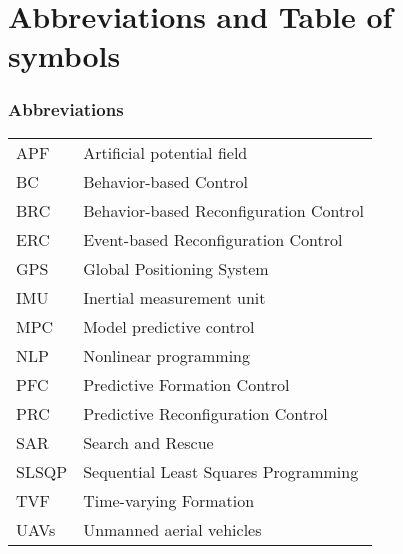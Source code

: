 \chapter*{Abbreviations and Table of symbols}

\subsection*{Abbreviations}
\vspace{-0.5cm}
\begin{table*}[h]
\begin{tabular}{p{2cm}p{8cm}}
APF     & Artificial potential field \\
BC      & Behavior-based Control \\
BRC     & Behavior-based Reconfiguration Control \\
ERC     & Event-based Reconfiguration Control \\
GPS     & Global Positioning System \\
IMU     & Inertial measurement unit \\
MPC     & Model predictive control \\
NLP     & Nonlinear programming \\
PFC     & Predictive Formation Control \\
PRC     & Predictive Reconfiguration Control \\
SAR     & Search and Rescue \\
SLSQP   & Sequential Least Squares Programming \\
TVF     & Time-varying Formation \\
UAVs    & Unmanned aerial vehicles \\
\end{tabular}
\end{table*}

